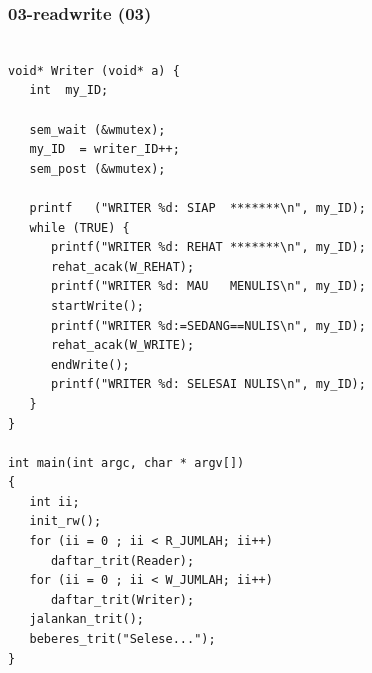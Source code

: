 \documentclass[xcolor=table, notheorems, hyperref={pdfpagelabels=false}]{beamer}
\begin{document}
\begin{frame}[fragile]
\frametitle{03-readwrite (03)}
\begin{lstlisting}[basicstyle=\ttfamily\tiny]

void* Writer (void* a) {
   int  my_ID;

   sem_wait (&wmutex);
   my_ID  = writer_ID++;
   sem_post (&wmutex);

   printf   ("WRITER %d: SIAP  *******\n", my_ID);
   while (TRUE) {
      printf("WRITER %d: REHAT *******\n", my_ID);
      rehat_acak(W_REHAT);
      printf("WRITER %d: MAU   MENULIS\n", my_ID);
      startWrite();
      printf("WRITER %d:=SEDANG==NULIS\n", my_ID);
      rehat_acak(W_WRITE);
      endWrite();
      printf("WRITER %d: SELESAI NULIS\n", my_ID);
   }
}

int main(int argc, char * argv[])
{
   int ii;
   init_rw();
   for (ii = 0 ; ii < R_JUMLAH; ii++)
      daftar_trit(Reader);
   for (ii = 0 ; ii < W_JUMLAH; ii++)
      daftar_trit(Writer);
   jalankan_trit();
   beberes_trit("Selese...");
}

\end{lstlisting}
\end{frame}
\end{document}
